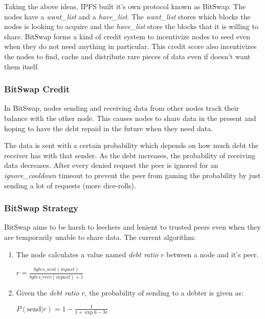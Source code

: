 Taking the above ideas, IPFS built it's own protocol known as BitSwap. The nodes have a \textit{want\_list} and a \textit{have\_list}. The \textit{want\_list} stores which blocks the nodes is looking to acquire and the \textit{have\_list} store the blocks that it is willing to share. BitSwap forms a kind of credit system to incentivize nodes to seed even when they do not need anything in particular. This credit score also incentivizes the nodes to find, cache and distribute rare pieces of data even if doesn't want them itself.

\subsubsection{BitSwap Credit}

In BitSwap, nodes sending and receiving data from other nodes track their balance with the other node. This causes nodes to share data in the present and hoping to have the debt repaid in the future when they need data.

The data is sent with a certain probability which depends on how much debt the receiver has with that sender. As the debt increases, the probability of receiving data decreases. After every denied request the peer is ignored for an \textit{ignore\_cooldown} timeout to prevent the peer from gaming the probability by just sending a lot of requests (more dice-rolls).

\subsubsection{BitSwap Strategy}

BitSwap aims to be harsh to leechers and lenient to trusted peers even when they are temporarily unable to share data. The current algorithm:

\begin{enumerate}
    \item The node calculates a value named \textit{debt ratio} $r$ between a node and it's peer.\\
    \begin{center}\Large
        $r = \frac{bytes\_sent (in past)}{bytes\_recv (in past) + 1}$
    \end{center}
    
    
    \item Given the \textit{debt ratio} $r$, the probability of sending to a debter is given as: \\
    \begin{center}\Large
        $P(\text{send} | r) = 1 - \frac{1}{1 + \exp{6 - 3r}}$
    \end{center}
    
\end{enumerate}

